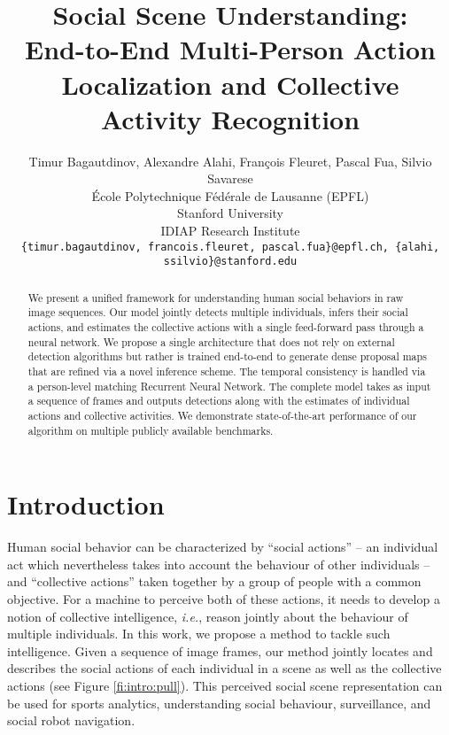 \documentclass[10pt,twocolumn,letterpaper]{article}
\begin{document}
\title{Social Scene Understanding:\\ End-to-End Multi-Person Action Localization and Collective Activity Recognition}

\author{Timur Bagautdinov, 
Alexandre Alahi, 
François Fleuret, 
Pascal Fua, 
Silvio Savarese\\
École Polytechnique Fédérale de Lausanne (EPFL)\\
Stanford University\\
IDIAP Research Institute\\
{\tt\small \{timur.bagautdinov, francois.fleuret, pascal.fua\}@epfl.ch, 
{\tt\small \{alahi, ssilvio\}@stanford.edu}}
}

\maketitle




\begin{abstract}
We present a unified framework for understanding human social behaviors in raw image
sequences. 
Our model jointly detects multiple individuals, infers their social actions, and 
estimates the collective actions with a single feed-forward pass through a neural network. 
We propose a single architecture that does not rely on external detection 
algorithms but rather is trained end-to-end to generate
dense proposal maps that are refined via a novel inference scheme.
The temporal consistency is handled via a person-level matching Recurrent Neural
Network. The complete model takes as input a sequence of frames and outputs
detections along with the estimates of individual actions and collective activities. We
demonstrate state-of-the-art performance of our algorithm on multiple publicly
available benchmarks.
\end{abstract}



\vspace{-0.5cm}
\section{Introduction}
\vspace{-0.15cm}

Human social behavior can be characterized by ``social actions'' -- an
individual act which nevertheless takes into account the behaviour of other
individuals -- and ``collective actions'' taken together by a group of people
with a common objective. For a machine to perceive both of these actions, it
needs to develop a notion of collective intelligence, \textit{i.e.}, reason
jointly about the behaviour of multiple individuals. In this work, we propose a
method to tackle such intelligence. Given a sequence of image frames, our method 
jointly locates and describes the
social actions of each individual in a scene as well as the collective actions (see
Figure \ref{fi:intro:pull}). This perceived social scene representation can be
used for sports analytics, understanding social behaviour, surveillance, and
social robot navigation.
\end{document}
